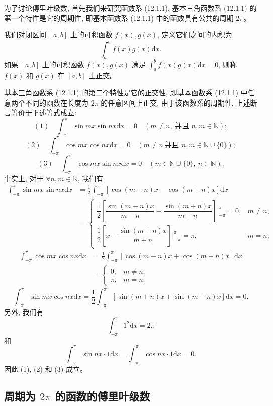 \documentclass[UTF8,12pt,a4paper,fontset=fandol]{ctexart}
\begin{document}
为了讨论傅里叶级数, 首先我们来研究函数系 (12.1.1). 基本三角函数系 (12.1.1) 的第一个特性是它的周期性, 即基本函数系 (12.1.1) 中的函数具有公共的周期 $2\pi$。

我们对闭区间 $[a,b]$ 上的可积函数 $f(x),g(x)$, 定义它们之间的内积为
\[
  \int_a^b f(x)g(x)\mathrm dx.
\]
如果 $[a,b]$ 上的可积函数 $f(x),g(x)$ 满足 $\int_a^b f(x)g(x)\mathrm dx=0$, 则称 $f(x)$ 和 $g(x)$ 在 $[a,b]$ 上正交。

基本三角函数系 (12.1.1) 的第二个特性是它的正交性, 即基本函数系 (12.1.1) 中任意两个不同的函数在长度为 $2\pi$ 的任意区间上正交. 由于该函数系的周期性, 上述断言等价于下述等式成立:
\[
  (1)\quad \int_{-\pi}^{\pi}\sin mx\sin nx\mathrm dx=0
  \quad (m\ne n,\ \text{并且 }n,m\in\mathbb N);
\]
\[
  (2)\quad \int_{-\pi}^{\pi}\cos mx\cos nx\mathrm dx=0
  \quad (m\ne n\ \text{并且 }n,m\in\mathbb N\cup\{0\});
\]
\[
  (3)\quad \int_{-\pi}^{\pi}\cos mx\sin nx\mathrm dx=0
  \quad (m\in\mathbb N\cup\{0\},\ n\in\mathbb N).
\]
事实上, 对于 $\forall n,m\in\mathbb N$, 我们有
\[
\begin{aligned}
  \int_{-\pi}^{\pi}\sin mx\sin nx\mathrm dx
  &=\frac12\int_{-\pi}^{\pi}[\cos(m-n)x-\cos(m+n)x]\mathrm dx \\
  &=
  \begin{cases}
    \dfrac12\left[\dfrac{\sin(m-n)x}{m-n}-\dfrac{\sin(m+n)x}{m+n}\right]\bigg|_{-\pi}^{\pi}=0,
      & m\ne n,\\[1.2em]
    \dfrac12\left[x-\dfrac{\sin(m+n)x}{m+n}\right]\bigg|_{-\pi}^{\pi}=\pi,
      & m=n;
  \end{cases}
\end{aligned}
\]
\[
\begin{aligned}
  \int_{-\pi}^{\pi}\cos mx\cos nx\mathrm dx
  &=\frac12\int_{-\pi}^{\pi}[\cos(m-n)x+\cos(m+n)x]\mathrm dx \\
  &=
  \begin{cases}
    0, & m\ne n,\\
    \pi, & m=n;
  \end{cases}
\end{aligned}
\]
\[
  \int_{-\pi}^{\pi}\sin mx\cos nx\mathrm dx
  =\frac12\int_{-\pi}^{\pi}[\sin(m+n)x+\sin(m-n)x]\mathrm dx=0.
\]
另外, 我们有
\[
  \int_{-\pi}^{\pi}1^2\mathrm dx=2\pi
\]
和
\[
  \int_{-\pi}^{\pi}\sin nx\cdot1\mathrm dx
  =\int_{-\pi}^{\pi}\cos nx\cdot1\mathrm dx=0.
\]
因此 (1), (2) 和 (3) 成立。

\subsection{周期为 $2\pi$ 的函数的傅里叶级数}
\end{document}

